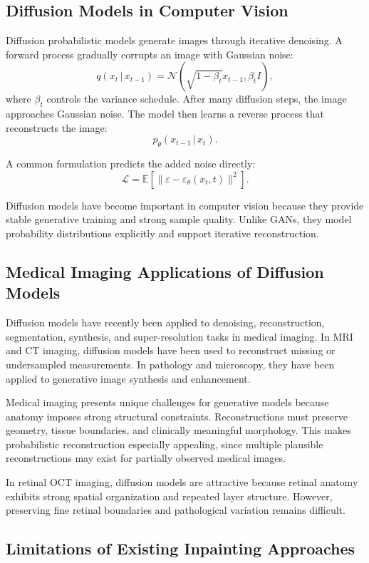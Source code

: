 \documentclass[12pt,oneside]{article}
\newcommand{\E}{\mathbb{E}}
\newcommand{\given}{\,|\,}
\begin{document}
\subsection*{Diffusion Models in Computer Vision}

Diffusion probabilistic models generate images through iterative denoising. A forward process gradually corrupts an image with Gaussian noise:
\[
q(x_t \given x_{t-1})
=
\mathcal{N}
\left(
\sqrt{1-\beta_t}x_{t-1},
\beta_t I
\right),
\]
where $\beta_t$ controls the variance schedule.
After many diffusion steps, the image approaches Gaussian noise. The model then learns a reverse process that reconstructs the image:
\[
p_\theta(x_{t-1}\given x_t).
\]

A common formulation predicts the added noise directly:
\[
\mathcal{L}
=
\E
\left[
\|
\varepsilon
-
\varepsilon_\theta(x_t,t)
\|^2
\right].
\]

Diffusion models have become important in computer vision because they provide stable generative training and strong sample quality. Unlike GANs, they model probability distributions explicitly and support iterative reconstruction.

\subsection*{Medical Imaging Applications of Diffusion Models}

Diffusion models have recently been applied to denoising, reconstruction, segmentation, synthesis, and super-resolution tasks in medical imaging. In MRI and CT imaging, diffusion models have been used to reconstruct missing or undersampled measurements. In pathology and microscopy, they have been applied to generative image synthesis and enhancement.

Medical imaging presents unique challenges for generative models because anatomy imposes strong structural constraints. Reconstructions must preserve geometry, tissue boundaries, and clinically meaningful morphology. This makes probabilistic reconstruction especially appealing, since multiple plausible reconstructions may exist for partially observed medical images.

In retinal OCT imaging, diffusion models are attractive because retinal anatomy exhibits strong spatial organization and repeated layer structure. However, preserving fine retinal boundaries and pathological variation remains difficult.

\subsection*{Limitations of Existing Inpainting Approaches}
\end{document}
